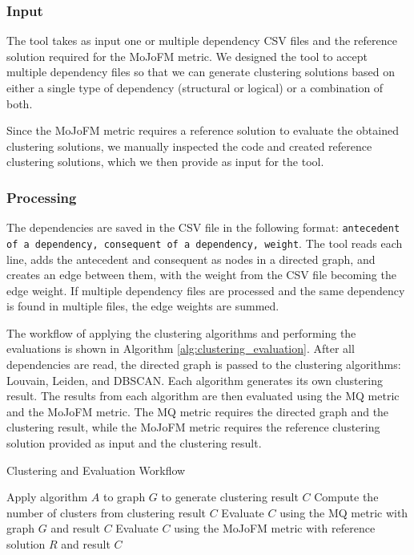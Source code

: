 \documentclass{ieeeaccess}
\begin{document}
\subsubsection{Input}

The tool takes as input one or multiple dependency CSV files and the reference solution required for the MoJoFM metric. We designed the tool to accept multiple dependency files so that we can generate clustering solutions based on either a single type of dependency (structural or logical) or a combination of both.

Since the MoJoFM metric requires a reference solution to evaluate the obtained clustering solutions, we manually inspected the code and created reference clustering solutions, which we then provide as input for the tool.

\subsubsection{Processing}

The dependencies are saved in the CSV file in the following format: \texttt{antecedent of a dependency, consequent of a dependency, weight}. The tool reads each line, adds the antecedent and consequent as nodes in a directed graph, and creates an edge between them, with the weight from the CSV file becoming the edge weight. If multiple dependency files are processed and the same dependency is found in multiple files, the edge weights are summed.

The workflow of applying the clustering algorithms and performing the evaluations is shown in Algorithm \ref{alg:clustering_evaluation}. After all dependencies are read, the directed graph is passed to the clustering algorithms: Louvain, Leiden, and DBSCAN. Each algorithm generates its own clustering result. The results from each algorithm are then evaluated using the MQ metric and the MoJoFM metric. The MQ metric requires the directed graph and the clustering result, while the MoJoFM metric requires the reference clustering solution provided as input and the clustering result. 


\begin{algorithm}
\caption{Clustering and Evaluation Workflow}
\label{alg:clustering_evaluation}
\begin{algorithmic}[1]

    \STATE Apply algorithm $A$ to graph $G$ to generate clustering result $C$
    \STATE Compute the number of clusters from clustering result $C$
    \STATE Evaluate $C$ using the MQ metric with graph $G$ and result $C$
    \STATE Evaluate $C$ using the MoJoFM metric with reference solution $R$ and result $C$
\ENDFOR

\end{algorithmic}
\end{algorithm}
\end{document}
